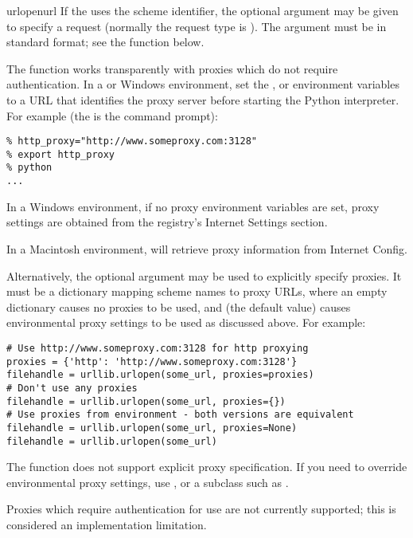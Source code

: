 \begin{funcdesc}{urlopen}{url}
If the  uses the  scheme identifier, the optional
 argument may be given to specify a  request
(normally the request type is ).  The  argument
must be in standard  format;
see the  function below.

The  function works transparently with proxies
which do not require authentication.  In a \UNIX{} or Windows
environment, set the ,  or
 environment variables to a URL that identifies
the proxy server before starting the Python interpreter.  For example
(the \character{\%} is the command prompt):

\begin{verbatim}
% http_proxy="http://www.someproxy.com:3128"
% export http_proxy
% python
...
\end{verbatim}

In a Windows environment, if no proxy environment variables are set,
proxy settings are obtained from the registry's Internet Settings
section.

In a Macintosh environment,  will retrieve proxy
information from Internet Config.

Alternatively, the optional  argument may be used to
explicitly specify proxies.  It must be a dictionary mapping scheme
names to proxy URLs, where an empty dictionary causes no proxies to be
used, and  (the default value) causes environmental proxy
settings to be used as discussed above.  For example:

\begin{verbatim}
# Use http://www.someproxy.com:3128 for http proxying
proxies = {'http': 'http://www.someproxy.com:3128'}
filehandle = urllib.urlopen(some_url, proxies=proxies)
# Don't use any proxies
filehandle = urllib.urlopen(some_url, proxies={})
# Use proxies from environment - both versions are equivalent
filehandle = urllib.urlopen(some_url, proxies=None)
filehandle = urllib.urlopen(some_url)
\end{verbatim}

The  function does not support explicit proxy
specification.  If you need to override environmental proxy settings,
use , or a subclass such as .

Proxies which require authentication for use are not currently
supported; this is considered an implementation limitation.

\end{funcdesc}

